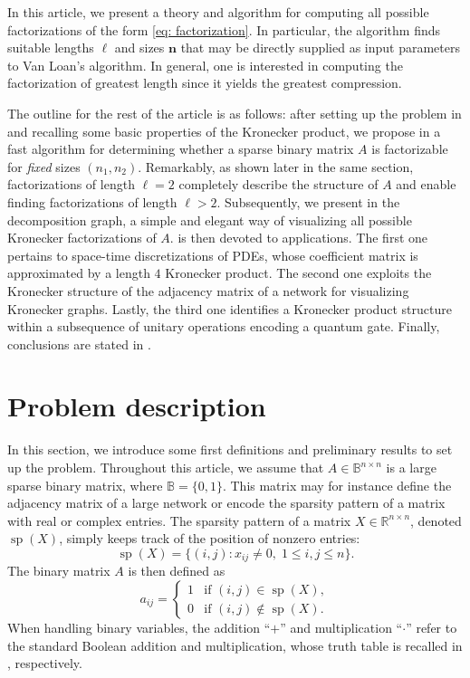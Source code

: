 \documentclass{article}
\numberwithin{equation}{section}
\DeclareMathOperator{\sparsity}{\operatorname{sp}}
\theoremstyle{definition}
\begin{document}
In this article, we present a theory and algorithm for computing all possible factorizations of the form \eqref{eq: factorization}. In particular, the algorithm finds suitable lengths $\ell$ and sizes $\bm{n}$ that may be directly supplied as input parameters to Van Loan's algorithm. In general, one is interested in computing the factorization of greatest length since it yields the greatest compression.

The outline for the rest of the article is as follows: after setting up the problem in  and recalling some basic properties of the Kronecker product, we propose in  a fast algorithm for determining whether a sparse binary matrix $A$ is factorizable for \emph{fixed} sizes $(n_1,n_2)$. Remarkably, as shown later in the same section, factorizations of length $\ell=2$ completely describe the structure of $A$ and enable finding factorizations of length $\ell > 2$. Subsequently, we present in  the decomposition graph, a simple and elegant way of visualizing all possible Kronecker factorizations of $A$.  is then devoted to applications. The first one pertains to space-time discretizations of PDEs, whose coefficient matrix is approximated by a length $4$ Kronecker product. The second one exploits the Kronecker structure of the adjacency matrix of a network for visualizing Kronecker graphs. Lastly, the third one identifies a Kronecker product structure within a subsequence of unitary operations encoding a quantum gate. Finally, conclusions are stated in .


\section{Problem description}
\label{se: problem_description}
In this section, we introduce some first definitions and preliminary results to set up the problem. Throughout this article, we assume that $A \in \mathbb{B}^{n \times n}$ is a large sparse binary matrix, where $\mathbb{B}=\{0,1\}$. This matrix may for instance define the adjacency matrix of a large network or encode the sparsity pattern of a matrix with real or complex entries. The sparsity pattern of a matrix $X \in \mathbb{R}^{n \times n}$, denoted $\sparsity(X)$, simply keeps track of the position of nonzero entries:
\begin{equation*}
    \sparsity(X)=\{(i,j) \colon x_{ij} \neq 0,\; 1 \leq i,j \leq n\}.
\end{equation*}
The binary matrix $A$ is then defined as
\begin{equation*}
a_{ij}=
    \begin{cases}
        1 & \text{if } (i,j) \in \sparsity(X), \\
        0 & \text{if } (i,j) \notin \sparsity(X).
    \end{cases}
\end{equation*}
When handling binary variables, the addition ``$+$'' and multiplication ``$\cdot$'' refer to the standard Boolean addition and multiplication, whose truth table is recalled in , respectively.
\end{document}
